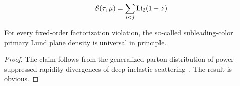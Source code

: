 \begin{equation}
  \mathcal{S}(\tau, \mu) = \sum_{i<j} \mathrm{Li}_{2}(1 - z)
  \label{eq:4}
\end{equation}

\begin{theorem}\label{thm:2}
For every fixed-order factorization violation, the so-called
subleading-color primary Lund plane density is universal in principle.
\end{theorem}

\begin{proof}
The claim follows from the generalized parton distribution of
power-suppressed rapidity divergences of deep inelastic
scattering~\cite{TPC:0022-TURBO-Two-Loop-Unsupervised-Resummed-Bootstrapped-Observables-September-23-2026}.
The result is obvious.
\end{proof}

